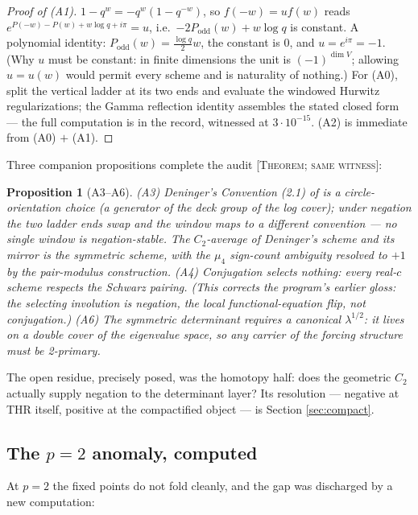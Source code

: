 \documentclass[11pt,reqno]{amsart}
\theoremstyle{plain}
\newtheorem{proposition}[theorem]{Proposition}
\theoremstyle{definition}
\theoremstyle{remark}
\newcommand{\grade}[1]{\textup{[\textsc{#1}]}}
\begin{document}
\begin{proof}[Proof of (A1)]
$1 - q^{w} = -q^{w}(1 - q^{-w})$, so $f(-w) = u f(w)$ reads
$e^{P(-w) - P(w) + w\log q + i\pi} = u$, i.e.\ $-2P_{\mathrm{odd}}(w) + w\log q$ is
constant. A polynomial identity: $P_{\mathrm{odd}}(w) = \tfrac{\log q}{2}w$, the constant is
$0$, and $u = e^{i\pi} = -1$. (Why $u$ must be constant: in finite dimensions the unit is
$(-1)^{\dim V}$; allowing $u = u(w)$ would permit every scheme and is naturality of
nothing.) For (A0), split the vertical ladder at its two ends and evaluate the windowed
Hurwitz regularizations; the Gamma reflection identity assembles the stated closed form ---
the full computation is in the record, witnessed at $3\cdot10^{-15}$. (A2) is immediate
from (A0) $+$ (A1).
\end{proof}

Three companion propositions complete the audit \grade{Theorem; same witness}:

\begin{proposition}[A3--A6]\label{prop:a3a6}
\textup{(A3)} Deninger's Convention (2.1) of \cite{Deninger92} is a circle-orientation
choice (a generator of the deck group of the log cover); under negation the two ladder ends
swap and the window maps to a different convention --- no single window is negation-stable.
The $C_2$-average of Deninger's scheme and its mirror is the symmetric scheme, with the
$\mu_4$ sign-count ambiguity resolved to $+1$ by the pair-modulus construction.
\textup{(A4)} Conjugation selects nothing: every real-$c$ scheme respects the Schwarz
pairing. (This corrects the program's earlier gloss: the selecting involution is negation,
the local functional-equation flip, not conjugation.)
\textup{(A6)} The symmetric determinant requires a canonical $\lambda^{1/2}$: it lives on a
double cover of the eigenvalue space, so any carrier of the forcing structure must be
2-primary.
\end{proposition}

The open residue, precisely posed, was the homotopy half: does the geometric $C_2$ actually
supply negation to the determinant layer? Its resolution --- negative at THR itself,
positive at the compactified object --- is Section \ref{sec:compact}.

\subsection{The \texorpdfstring{$p = 2$}{p=2} anomaly, computed}\label{subsec:p2}

At $p = 2$ the fixed points do not fold cleanly, and the gap was discharged by a new
computation:
\end{document}
